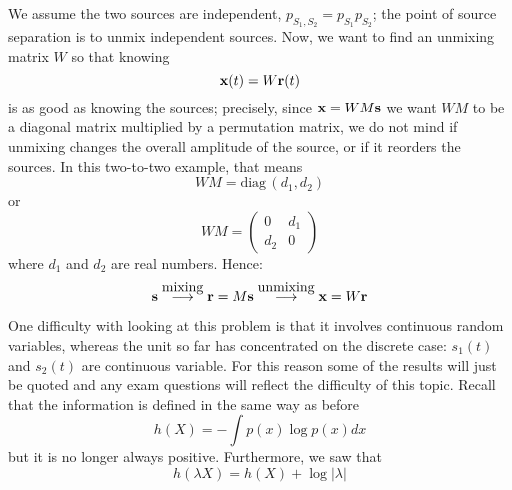 \documentclass[12pt]{article}
\begin{document}
We assume the two sources are independent,
$p_{S_1,S_2}=p_{S_1}p_{S_2}$; the point of source separation is to
unmix independent sources. Now, we want to find an unmixing matrix $W$ so that knowing
\begin{equation} {\bf x}(t)=W{\bf r}(t) \end{equation} is as good as
knowing the sources; precisely, since ${\bf x}=WM{\bf s}$ we want $WM$
to be a diagonal matrix multiplied by a permutation matrix, we do not
mind if unmixing changes the overall amplitude of the source, or if it
reorders the sources. In this two-to-two example, that means
\begin{equation} WM=\mbox{diag}\,(d_1,d_2) \end{equation} or
\begin{equation}
WM=\left(\begin{array}{cc}0&d_1\\d_2&0\end{array}\right)
\end{equation} where $d_1$ and $d_2$ are real numbers. Hence:
\begin{equation} {\bf s}\stackrel{\mbox{mixing}}{\longrightarrow}{\bf
r}=M{\bf s}\stackrel{\mbox{unmixing}}{\longrightarrow}{\bf x}=W{\bf r}
\end{equation}

One difficulty with looking at this problem is that it involves
continuous random variables, whereas the unit so far has concentrated
on the discrete case: $s_1(t)$ and $s_2(t)$ are continuous
variable. For this reason some of the results will just be quoted and
any exam questions will reflect the difficulty of this topic. Recall that the
information is defined in the same way as before
\begin{equation} 
h(X)=-\int  p(x)\log{p(x)} dx 
\end{equation} 
but it is no longer always positive. Furthermore, we saw that
\begin{equation} 
h(\lambda X)=h(X)+\log{|\lambda|} 
\end{equation} 
\end{document}
